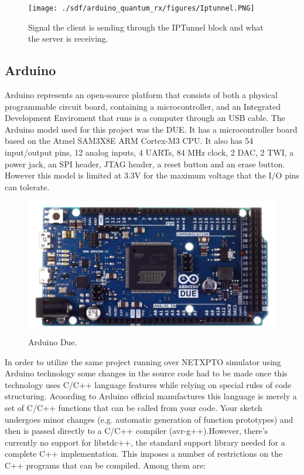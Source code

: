 \begin{refsection}
		\begin{figure}[H]
		\centering
		\texttt{[image: ./sdf/arduino\_quantum\_rx/figures/Iptunnel.PNG]}
		\caption{Signal the client is sending through the IPTunnel block and what the server is receiving.}
		\label{fig:arduino}
		
	\end{figure}
	\clearpage
	
	    \subsection{Arduino}
	     Arduino represents an open-source platform that consists of both a physical programmable circuit board, containing a microcontroller, and an  Integrated Development Enviroment that runs is a computer through an USB cable.
	    The Arduino model used for this project was the DUE. It has a microcontroller board based on the Atmel SAM3X8E ARM Cortex-M3 CPU. It also has 54 input/output pins, 12 analog inputs, 4 UARTs, 84 MHz clock, 2 DAC, 2 TWI, a power jack, an SPI header, JTAG header, a reset button and an erase button. However this model is limited at 3.3V for the maximum voltage that the I/O pins can tolerate.  
	    
	    \begin{figure}[H]
	    	\centering
	    	\includegraphics[width=0.8\linewidth]{./sdf/arduino_quantum_rx/figures/arduino.PNG}
	    	\caption{Arduino Due.}
	    	\label{fig:arduino}
	    \end{figure}
	    	
	    In order to utilize the same project running over NETXPTO simulator using Arduino technology some changes in the source code had to be made once this technology uses C/C++ language features while relying on special rules of code structuring. Acoording to Arduino official manufactures this language is merely a set of C/C++ functions that can be called from your code. Your sketch undergoes minor changes (e.g. automatic generation of function prototypes) and then is passed directly to a C/C++ compiler (avr-g++).However, there's currently no support for libstdc++, the standard support library needed for a complete C++ implementation. This imposes a number of restrictions on the C++ programs that can be compiled. Among them are:
	    

\end{refsection}
